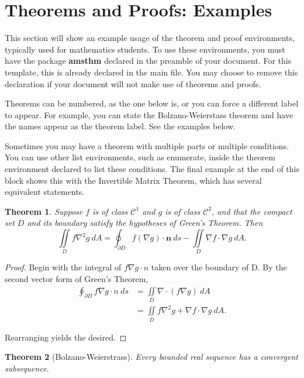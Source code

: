 \section{Theorems and Proofs: Examples}

This section will show an example usage of the theorem and proof environments, typically used for mathematics students. To use these environments, you must have the package \textbf{amsthm} declared in the preamble of your document. For this template, this is already declared in the main file. You may choose to remove this declaration if your document will not make use of theorems and proofs.

Theorems can be numbered, as the one below is, or you can force a different label to appear. For example, you can state the Bolzano-Weierstass theorem and have the names appear as the theorem label. See the examples below.

Sometimes you may have a theorem with multiple parts or multiple conditions. You can use other list environments, such as enumerate, inside the theorem environment declared to list these conditions. The final example at the end of this block shows this with the Invertible Matrix Theorem, which has several equivalent statements.

\newtheorem{thm}{Theorem}
\begin{thm}
	Suppose $f$ is of class $\mathcal{C}^1$ and $g$ is of class $\mathcal{C}^2$, and that the compact set $D$ and its boundary satisfy the hypotheses of Green's Theorem.  Then
	\[ \iint \limits_D f\nabla^2 g \ dA = \oint_{\partial D} f(\nabla g) \cdot \mathbf{n} \ ds - \iint \limits_D \nabla f \cdot \nabla g \ dA . \]
\end{thm}

\begin{proof}
	Begin with the integral of $f\nabla g \cdot n$ taken over the boundary of D.  By the second vector form of Green's Theorem,
	\begin{align*}
	\oint_{\partial D} f\nabla g \cdot n \ ds &= \iint \limits_D \nabla \cdot (f\nabla g) \ dA \\
	&= \iint \limits_D f\nabla^2 g + \nabla f \cdot \nabla g \ dA.
	\end{align*}
	
	Rearranging yields the desired.
\end{proof}

\begin{thm}[Bolzano-Weierstrass]
	Every bounded real sequence has a convergent subsequence.
\end{thm}


